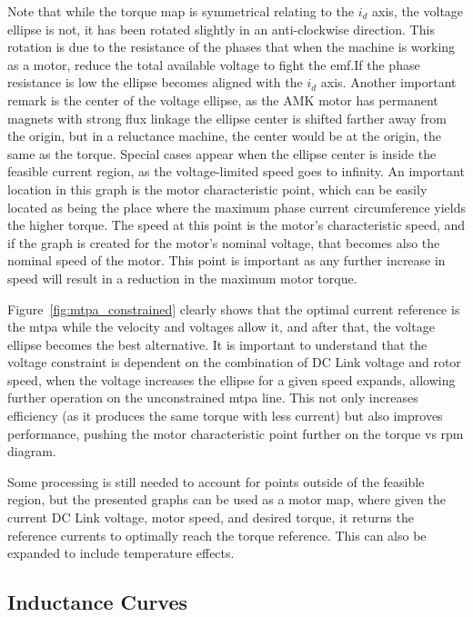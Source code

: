 Note that while the torque map is symmetrical relating to the $i_d$ axis, the voltage ellipse is not, it has been rotated slightly in an anti-clockwise direction. This rotation is due to the resistance of the phases that when the machine is working as a motor, reduce the total available voltage to fight the \gls{emf}.\@ If the phase resistance is low the ellipse becomes aligned with the $i_d$ axis. Another important remark is the center of the voltage ellipse, as the AMK motor has permanent magnets with strong flux linkage the ellipse center is shifted farther away from the origin, but in a reluctance machine, the center would be at the origin, the same as the torque. Special cases appear when the ellipse center is inside the feasible current region, as the voltage-limited speed goes to infinity. An important location in this graph is the motor characteristic point, which can be easily located as being the place where the maximum phase current circumference yields the higher torque. The speed at this point is the motor's characteristic speed, and if the graph is created for the motor's nominal voltage, that becomes also the nominal speed of the motor. This point is important as any further increase in speed will result in a reduction in the maximum motor torque.

Figure~\ref{fig:mtpa_constrained} clearly shows that the optimal current reference is the \gls{mtpa} while the velocity and voltages allow it, and after that, the voltage ellipse becomes the best alternative. It is important to understand that the voltage constraint is dependent on the combination of DC Link voltage and rotor speed, when the voltage increases the ellipse for a given speed expands, allowing further operation on the unconstrained \gls{mtpa} line. This not only increases efficiency (as it produces the same torque with less current) but also improves performance, pushing the motor characteristic point further on the torque vs rpm diagram. 

Some processing is still needed to account for points outside of the feasible region, but the presented graphs can be used as a motor map,  where given the current DC Link voltage, motor speed, and desired torque, it returns the reference currents to optimally reach the torque reference. This can also be expanded to include temperature effects. 

\subsection{Inductance Curves}
\label{section:inductance_curves_current_reference}

